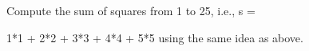 Compute the sum of squares from 1 to 25, i.e., s =

1*1 + 2*2 + 3*3 + 4*4 + 5*5 using the same idea as above.

